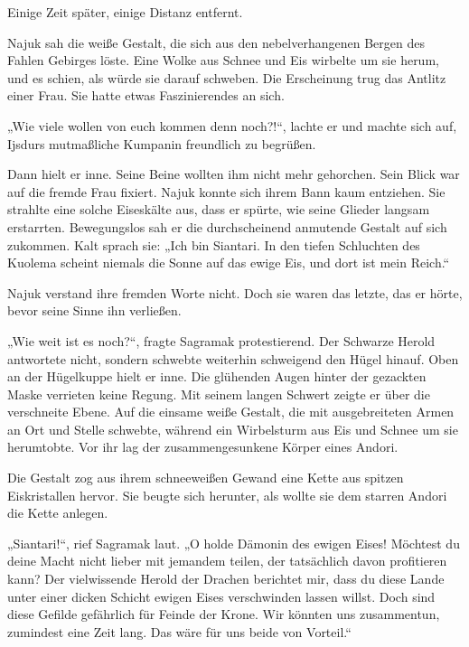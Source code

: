 Einige Zeit später, einige Distanz entfernt.\bigskip



Najuk sah die weiße Gestalt, die sich aus den nebelverhangenen Bergen des Fahlen Gebirges löste. Eine Wolke aus Schnee und Eis wirbelte um sie herum, und es schien, als würde sie darauf schweben. Die Erscheinung trug das Antlitz einer Frau. Sie hatte etwas Faszinierendes an sich.

„Wie viele wollen von euch kommen denn noch?!“, lachte er und machte sich auf, Ijsdurs mutmaßliche Kumpanin freundlich zu begrüßen.

Dann hielt er inne. Seine Beine wollten ihm nicht mehr gehorchen. Sein Blick war auf die fremde Frau fixiert. Najuk konnte sich ihrem Bann kaum entziehen. Sie strahlte eine solche Eiseskälte aus, dass er spürte, wie seine Glieder langsam erstarrten. Bewegungslos sah er die durchscheinend anmutende Gestalt auf sich zukommen. Kalt sprach sie: „Ich bin Siantari. In den tiefen Schluchten des Kuolema scheint niemals die Sonne auf das ewige Eis, und dort ist mein Reich.“

Najuk verstand ihre fremden Worte nicht. Doch sie waren das letzte, das er hörte, bevor seine Sinne ihn verließen.\bigskip







„Wie weit ist es noch?“, fragte Sagramak protestierend. Der Schwarze Herold antwortete nicht, sondern schwebte weiterhin schweigend den Hügel hinauf. Oben an der Hügelkuppe hielt er inne. Die glühenden Augen hinter der gezackten Maske verrieten keine Regung. Mit seinem langen Schwert zeigte er über die verschneite Ebene. Auf die einsame weiße Gestalt, die mit ausgebreiteten Armen an Ort und Stelle schwebte, während ein Wirbelsturm aus Eis und Schnee um sie herumtobte. Vor ihr lag der zusammengesunkene Körper eines Andori.

Die Gestalt zog aus ihrem schneeweißen Gewand eine Kette aus spitzen Eiskristallen hervor. Sie beugte sich herunter, als wollte sie dem starren Andori die Kette anlegen.

„Siantari!“, rief Sagramak laut. „O holde Dämonin des ewigen Eises! Möchtest du deine Macht nicht lieber mit jemandem teilen, der tatsächlich davon profitieren kann? Der vielwissende Herold der Drachen berichtet mir, dass du diese Lande unter einer dicken Schicht ewigen Eises verschwinden lassen willst. Doch sind diese Gefilde gefährlich für Feinde der Krone. Wir könnten uns zusammentun, zumindest eine Zeit lang. Das wäre für uns beide von Vorteil.“


